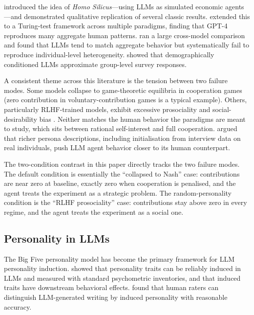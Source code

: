 \documentclass[12pt, a4paper]{article}
\begin{document}
\citet{horton2023homo} introduced the idea of \emph{Homo Silicus}---using LLMs as simulated economic agents---and demonstrated qualitative replication of several classic results. \citet{aher2023turing} extended this to a Turing-test framework across multiple paradigms, finding that GPT-4 reproduces many aggregate human patterns. \citet{mei2024turing} ran a large cross-model comparison and found that LLMs tend to match aggregate behavior but systematically fail to reproduce individual-level heterogeneity. \citet{argyle2023out} showed that demographically conditioned LLMs approximate group-level survey responses.

A consistent theme across this literature is the tension between two failure modes. Some models collapse to game-theoretic equilibria in cooperation games (zero contribution in voluntary-contribution games is a typical example). Others, particularly RLHF-trained models, exhibit excessive prosociality and social-desirability bias \citep{salecha2024social}. Neither matches the human behavior the paradigms are meant to study, which sits between rational self-interest and full cooperation. \citet{park2024generative} argued that richer persona descriptions, including initialisation from interview data on real individuals, push LLM agent behavior closer to its human counterpart.

The two-condition contrast in this paper directly tracks the two failure modes. The default condition is essentially the ``collapsed to Nash'' case: contributions are near zero at baseline, exactly zero when cooperation is penalised, and the agent treats the experiment as a strategic problem. The random-personality condition is the ``RLHF prosociality'' case: contributions stay above zero in every regime, and the agent treats the experiment as a social one.

\subsection{Personality in LLMs}

The Big Five personality model has become the primary framework for LLM personality induction. \citet{serapio2023personality} showed that personality traits can be reliably induced in LLMs and measured with standard psychometric inventories, and that induced traits have downstream behavioral effects. \citet{jiang2024personallm} found that human raters can distinguish LLM-generated writing by induced personality with reasonable accuracy.
\end{document}
